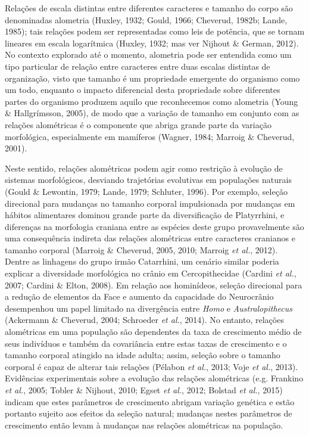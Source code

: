 \documentclass[12pt,twoside]{report}
\begin{document}
Relações de escala distintas entre diferentes caracteres e tamanho do
corpo são denominadas alometria (Huxley, 1932; Gould, 1966; Cheverud,
1982b; Lande, 1985); tais relações podem ser representadas como leis de
potência, que se tornam lineares em escala logarítmica (Huxley, 1932;
mas ver Nijhout \& German, 2012). No contexto explorado até o momento,
alometria pode ser entendida como um tipo particular de relação entre
caracteres entre duas escalas distintas de organização, visto que
tamanho é um propriedade emergente do organismo como um todo, enquanto o
impacto diferencial desta propriedade sobre diferentes partes do
organismo produzem aquilo que reconhecemos como alometria (Young \&
Hallgrímsson, 2005), de modo que a variação de tamanho em conjunto com
as relações alométricas é o componente que abriga grande parte da
variação morfológica, especialmente em mamíferos (Wagner, 1984; Marroig
\& Cheverud, 2001).

Neste sentido, relações alométricas podem agir como restrição à evolução
de sistemas morfológicos, desviando trajetórias evolutivas em populações
naturais (Gould \& Lewontin, 1979; Lande, 1979; Schluter, 1996). Por
exemplo, seleção direcional para mudanças no tamanho corporal
impulsionada por mudanças em hábitos alimentares dominou grande parte da
diversificação de Platyrrhini, e diferenças na morfologia craniana entre
as espécies deste grupo provavelmente são uma consequência indireta das
relações alométricas entre caracteres cranianos e tamanho corporal
(Marroig \& Cheverud, 2005, 2010; Marroig \emph{et al.}, 2012). Dentre
as linhagens do grupo irmão Catarrhini, um cenário similar poderia
explicar a diversidade morfológica no crânio em Cercopithecidae (Cardini
\emph{et al.}, 2007; Cardini \& Elton, 2008). Em relação aos hominídeos,
seleção direcional para a redução de elementos da Face e aumento da
capacidade do Neurocrânio desempenhou um papel limitado na divergência
entre \emph{Homo} e \emph{Australopithecus} (Ackermann \& Cheverud,
2004; Schroeder \emph{et al.}, 2014). No entanto, relações alométricas
em uma população são dependentes da taxa de crescimento médio de seus
indivíduos e também da covariância entre estas taxas de crescimento e o
tamanho corporal atingido na idade adulta; assim, seleção sobre o
tamanho corporal é capaz de alterar tais relações (Pélabon \emph{et
al.}, 2013; Voje \emph{et al.}, 2013). Evidências experimentais sobre a
evolução das relações alométricas (e.g. Frankino \emph{et al.}, 2005;
Tobler \& Nijhout, 2010; Egset \emph{et al.}, 2012; Bolstad \emph{et
al.}, 2015) indicam que estes parâmetros de crescimento abrigam variação
genética e estão portanto sujeito aos efeitos da seleção natural;
mudanças nestes parâmetros de crescimento então levam à mudanças nas
relações alométricas na população.
\end{document}
